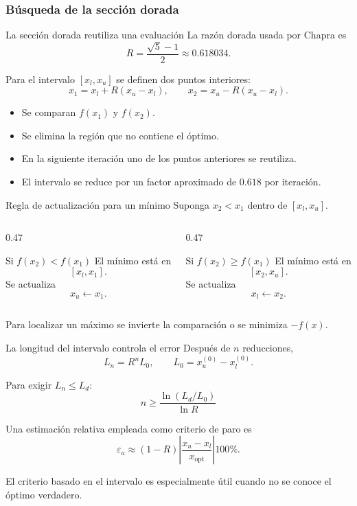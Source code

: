\documentclass[../../main.tex]{subfiles}
\begin{document}
\subsubsection{Búsqueda de la sección dorada}

\begin{frame}{La sección dorada reutiliza una evaluación}
La razón dorada usada por Chapra es
\[
R=\frac{\sqrt{5}-1}{2}\approx0.618034.
\]

Para el intervalo $[x_l,x_u]$ se definen dos puntos interiores:
\[
x_1=x_l+R(x_u-x_l),
\qquad
x_2=x_u-R(x_u-x_l).
\]

\begin{itemize}
  \item Se comparan $f(x_1)$ y $f(x_2)$.
  \item Se elimina la región que no contiene el óptimo.
  \item En la siguiente iteración uno de los puntos anteriores se reutiliza.
  \item El intervalo se reduce por un factor aproximado de $0.618$ por iteración.
\end{itemize}
\end{frame}

\begin{frame}{Regla de actualización para un mínimo}
Suponga $x_2<x_1$ dentro de $[x_l,x_u]$.

\begin{columns}[T]
\begin{column}{0.47\textwidth}
\begin{block}{Si $f(x_2)<f(x_1)$}
El mínimo está en
\[
[x_l,x_1].
\]
Se actualiza
\[
x_u\leftarrow x_1.
\]
\end{block}
\end{column}

\begin{column}{0.47\textwidth}
\begin{block}{Si $f(x_2)\ge f(x_1)$}
El mínimo está en
\[
[x_2,x_u].
\]
Se actualiza
\[
x_l\leftarrow x_2.
\]
\end{block}
\end{column}
\end{columns}

\medskip
Para localizar un máximo se invierte la comparación o se minimiza $-f(x)$.
\end{frame}

\begin{frame}{La longitud del intervalo controla el error}
Después de $n$ reducciones,
\[
L_n=R^nL_0,
\qquad
L_0=x_u^{(0)}-x_l^{(0)}.
\]

Para exigir $L_n\le L_d$:
\[
\boxed{
n\ge
\frac{\ln(L_d/L_0)}{\ln R}
}
\]

Una estimación relativa empleada como criterio de paro es
\[
\varepsilon_a
\approx
(1-R)\left|\frac{x_u-x_l}{x_{\mathrm{opt}}}\right|100\%.
\]

El criterio basado en el intervalo es especialmente útil cuando no se conoce el óptimo verdadero.
\end{frame}
\end{document}
